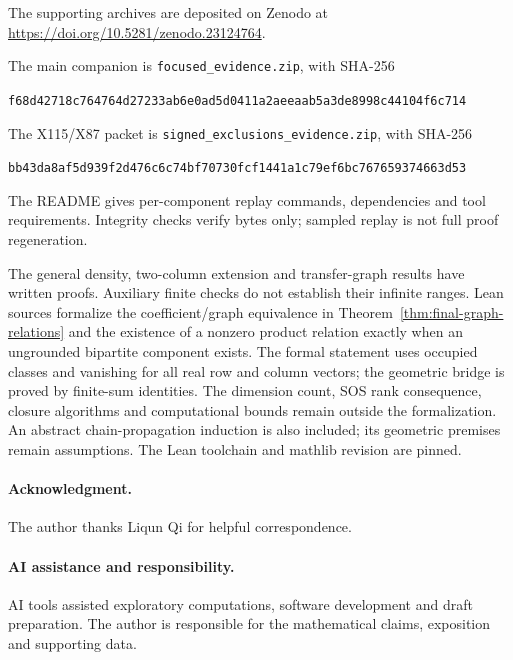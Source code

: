 \documentclass[11pt,a4paper]{article}
\theoremstyle{definition}
\begin{document}
The supporting archives are deposited on Zenodo at
\url{https://doi.org/10.5281/zenodo.23124764}.

The main companion is \texttt{focused\_evidence.zip}, with SHA-256
\begin{center}\footnotesize\texttt{f68d42718c764764d27233ab6e0ad5d0411a2aeeaab5a3de8998c44104f6c714}\end{center}
The X115/X87 packet is
\texttt{signed\_exclusions\_evidence.zip}, with SHA-256
\begin{center}\footnotesize\texttt{bb43da8af5d939f2d476c6c74bf70730fcf1441a1c79ef6bc767659374663d53}\end{center}
The README gives per-component replay commands, dependencies and tool
requirements. Integrity checks verify bytes only; sampled replay is not
full proof regeneration. 

The general density, two-column extension and transfer-graph results have
written proofs. Auxiliary finite checks do not establish their infinite
ranges. Lean sources formalize the coefficient/graph equivalence in
Theorem~\ref{thm:final-graph-relations} and the existence of a nonzero
product relation exactly when an ungrounded bipartite component exists.
The formal statement uses occupied classes and vanishing for all real row and column vectors; the
geometric bridge is proved by finite-sum identities. The dimension count,
SOS rank consequence, closure algorithms and computational bounds remain
outside the formalization. An abstract chain-propagation induction is
also included; its geometric premises remain assumptions.
The Lean toolchain and mathlib revision are pinned.

\paragraph{Acknowledgment.}
The author thanks Liqun Qi for helpful correspondence.

\paragraph{AI assistance and responsibility.}
AI tools assisted exploratory computations, software development and
draft preparation. The author is responsible for the mathematical
claims, exposition and supporting data.
\end{document}
